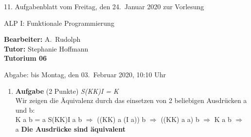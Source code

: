 \documentclass[11pt]{article}
\newcommand{\VORLESUNG}{ALP I: Funktionale Programmierung}
\newcommand{\STAFF}{A.\ Rudolph}
\newcommand{\ASSIGNMENT}{11}
\newcommand{\HANDOUT}{Freitag, den 24.\ Januar   2020}
\newcommand{\TUTOR}{Stephanie Hoffmann}
\newcommand{\DELIVER}{bis Montag, den 03.\ Februar 2020, 10:10 Uhr}
\newcommand{\punkte}[1]{{\small{ }(#1 Punkte)}}
\newcommand{\aufgabe}[1]{\item{\bf #1}}
\begin{document}
\begin{center}
\ASSIGNMENT{}. Aufgabenblatt vom \HANDOUT{} zur Vorlesung 
\vspace*{0.5cm}

{\Large \VORLESUNG{}}

\textbf{Bearbeiter:} \STAFF{}\\
\textbf{Tutor:} \TUTOR\\
\textbf{Tutorium 06}
\vspace*{0.5cm}

{\small Abgabe: \DELIVER{}}
\vspace*{1cm}
\end{center}

\begin{enumerate}
\aufgabe{Aufgabe}\punkte{2}
\textit{S(KK)I = K}\\
Wir zeigen die Äquivalenz durch das einsetzen von 2 beliebigen Ausdrücken a und b:\\
K a b = a
\newline
S(KK)I a b
$\Rightarrow$ ((KK) a (I a)) b
$\Rightarrow$ ((KK) a a) b
$\Rightarrow$ K a b
$\Rightarrow$ a
\newline
\textbf{Die Ausdrücke sind äquivalent}


\end{enumerate}
\end{document}
